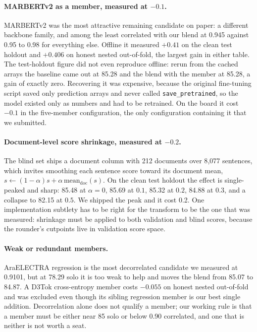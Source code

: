 \paragraph{MARBERTv2 as a member, measured at $-0.1$.} MARBERTv2 was the most
attractive remaining candidate on paper: a different backbone family, and among the least
correlated with our blend at 0.945 against 0.95 to 0.98 for everything else. Offline it
measured $+0.41$ on the clean test holdout and $+0.406$ on honest nested out-of-fold, the
largest gain in either table. The test-holdout figure did not even reproduce offline: rerun
from the cached arrays the baseline came out at 85.28 and the blend with the member at
85.28, a gain of exactly zero. Recovering it was expensive, because the original fine-tuning
script saved only prediction arrays and never called \texttt{save\_pretrained}, so the model
existed only as numbers and had to be retrained. On the board it cost $-0.1$ in the
five-member configuration, the only configuration containing it that we submitted.

\paragraph{Document-level score shrinkage, measured at $-0.2$.} The blind set ships a
document column with 212 documents over 8{,}077 sentences, which invites smoothing each
sentence score toward its document mean,
$s \leftarrow (1-\alpha) s + \alpha \, \mathrm{mean}_{\text{doc}}(s)$. On the clean test
holdout the effect is single-peaked and sharp: 85.48 at $\alpha = 0$, 85.69 at $0.1$, 85.32
at $0.2$, 84.88 at $0.3$, and a collapse to 82.15 at $0.5$. We shipped the peak and it cost
0.2. One implementation subtlety has to be right for the transform to be the one that was
measured: shrinkage must be applied to both validation and blind scores, because the
rounder's cutpoints live in validation score space.

\paragraph{Weak or redundant members.} AraELECTRA regression is the most decorrelated
candidate we measured at 0.9101, but at 78.29 solo it is too weak to help and moves the
blend from 85.07 to 84.87. A D3Tok cross-entropy member costs $-0.055$ on honest nested
out-of-fold and was excluded even though its sibling regression member is our best single
addition. Decorrelation alone does not qualify a member; our working rule is that a member
must be either near 85 solo or below 0.90 correlated, and one that is neither is not worth
a seat.

